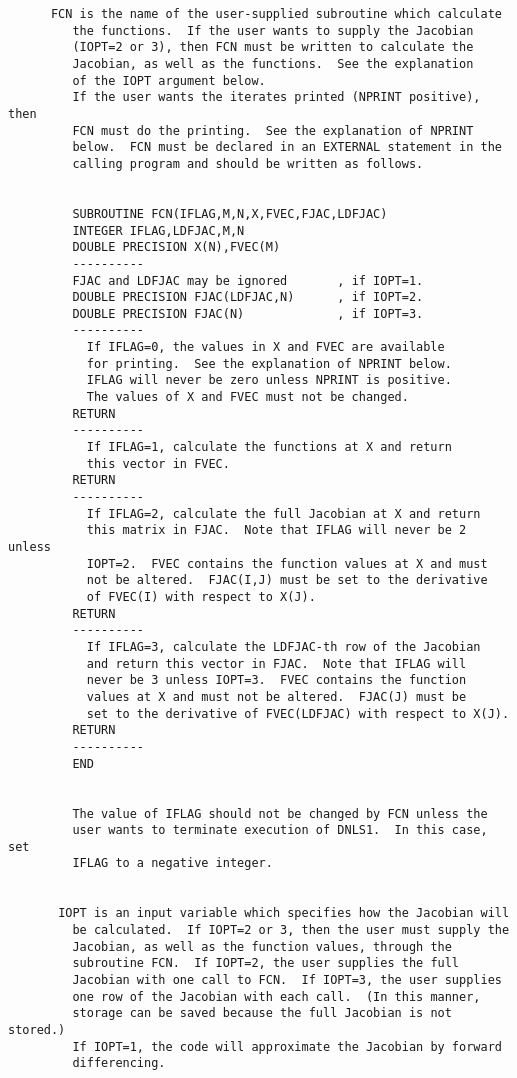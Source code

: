 \begin{verbatim}
      FCN is the name of the user-supplied subroutine which calculate
         the functions.  If the user wants to supply the Jacobian
         (IOPT=2 or 3), then FCN must be written to calculate the
         Jacobian, as well as the functions.  See the explanation
         of the IOPT argument below.
         If the user wants the iterates printed (NPRINT positive), then
         FCN must do the printing.  See the explanation of NPRINT
         below.  FCN must be declared in an EXTERNAL statement in the
         calling program and should be written as follows.


         SUBROUTINE FCN(IFLAG,M,N,X,FVEC,FJAC,LDFJAC)
         INTEGER IFLAG,LDFJAC,M,N
         DOUBLE PRECISION X(N),FVEC(M)
         ----------
         FJAC and LDFJAC may be ignored       , if IOPT=1.
         DOUBLE PRECISION FJAC(LDFJAC,N)      , if IOPT=2.
         DOUBLE PRECISION FJAC(N)             , if IOPT=3.
         ----------
           If IFLAG=0, the values in X and FVEC are available
           for printing.  See the explanation of NPRINT below.
           IFLAG will never be zero unless NPRINT is positive.
           The values of X and FVEC must not be changed.
         RETURN
         ----------
           If IFLAG=1, calculate the functions at X and return
           this vector in FVEC.
         RETURN
         ----------
           If IFLAG=2, calculate the full Jacobian at X and return
           this matrix in FJAC.  Note that IFLAG will never be 2 unless
           IOPT=2.  FVEC contains the function values at X and must
           not be altered.  FJAC(I,J) must be set to the derivative
           of FVEC(I) with respect to X(J).
         RETURN
         ----------
           If IFLAG=3, calculate the LDFJAC-th row of the Jacobian
           and return this vector in FJAC.  Note that IFLAG will
           never be 3 unless IOPT=3.  FVEC contains the function
           values at X and must not be altered.  FJAC(J) must be
           set to the derivative of FVEC(LDFJAC) with respect to X(J).
         RETURN
         ----------
         END


         The value of IFLAG should not be changed by FCN unless the
         user wants to terminate execution of DNLS1.  In this case, set
         IFLAG to a negative integer.


       IOPT is an input variable which specifies how the Jacobian will
         be calculated.  If IOPT=2 or 3, then the user must supply the
         Jacobian, as well as the function values, through the
         subroutine FCN.  If IOPT=2, the user supplies the full
         Jacobian with one call to FCN.  If IOPT=3, the user supplies
         one row of the Jacobian with each call.  (In this manner,
         storage can be saved because the full Jacobian is not stored.)
         If IOPT=1, the code will approximate the Jacobian by forward
         differencing.


\end{verbatim}
